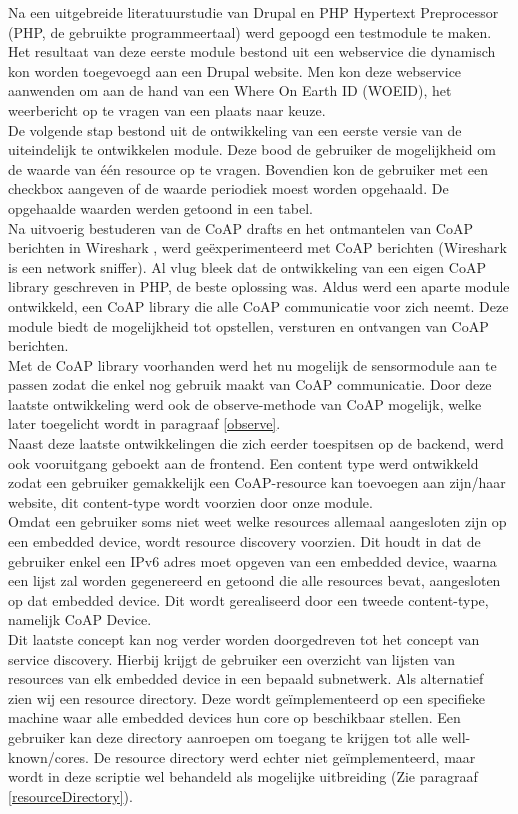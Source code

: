 Na een uitgebreide literatuurstudie van Drupal en PHP Hypertext Preprocessor (PHP, de gebruikte programmeertaal) werd gepoogd een testmodule te maken. Het resultaat van deze eerste module bestond uit een webservice die dynamisch kon worden toegevoegd aan een Drupal website. Men kon deze webservice aanwenden om aan de hand van een Where On Earth ID (WOEID), het weerbericht op te vragen van een plaats naar keuze.\\
De volgende stap bestond uit de ontwikkeling van een eerste versie van de uiteindelijk te ontwikkelen module. Deze bood de gebruiker de mogelijkheid om de waarde van \'{e}\'{e}n resource op te vragen. Bovendien kon de gebruiker met een checkbox aangeven of de waarde periodiek moest worden opgehaald. De opgehaalde waarden werden getoond in een tabel.\\
Na uitvoerig bestuderen van de CoAP drafts en het ontmantelen van CoAP berichten in Wireshark \cite{wireshark}, werd ge\"{e}xperimenteerd met CoAP berichten (Wireshark is een network sniffer). Al vlug bleek dat de ontwikkeling van een eigen CoAP library geschreven in PHP, de beste oplossing was. Aldus werd een aparte module ontwikkeld, een CoAP library die alle CoAP communicatie voor zich neemt. Deze module biedt de mogelijkheid tot opstellen, versturen en ontvangen van CoAP berichten.\\
Met de CoAP library voorhanden werd het nu mogelijk de sensormodule aan te passen zodat die enkel nog gebruik maakt van CoAP communicatie. Door deze laatste ontwikkeling werd ook de observe-methode van CoAP mogelijk, welke later toegelicht wordt in paragraaf \ref{observe}.\\
Naast deze laatste ontwikkelingen die zich eerder toespitsen op de backend, werd ook vooruitgang geboekt aan de frontend. Een content type werd ontwikkeld zodat een gebruiker gemakkelijk een CoAP-resource kan toevoegen aan zijn/haar website, dit content-type wordt voorzien door onze module.\\
Omdat een gebruiker soms niet weet welke resources allemaal aangesloten zijn op een embedded device, wordt resource discovery voorzien. Dit houdt in dat de gebruiker enkel een IPv6 adres moet opgeven van een embedded device, waarna een lijst zal worden gegenereerd en getoond die alle resources bevat, aangesloten op dat embedded device. Dit wordt gerealiseerd door een tweede content-type, namelijk CoAP Device.\\
Dit laatste concept kan nog verder worden doorgedreven tot het concept van service discovery. Hierbij krijgt de gebruiker een overzicht van lijsten van resources van elk embedded device in een bepaald subnetwerk. Als alternatief zien wij een resource directory. Deze wordt ge\"{i}mplementeerd op een specifieke machine waar alle embedded devices hun core op beschikbaar stellen. Een gebruiker kan deze directory aanroepen om toegang te krijgen tot alle well-known/cores. De resource directory werd echter niet geïmplementeerd, maar wordt in deze scriptie wel behandeld als mogelijke uitbreiding (Zie paragraaf \ref{resourceDirectory}).\\
